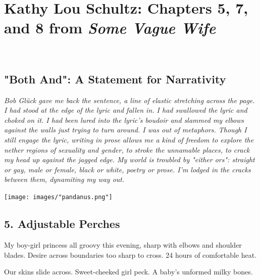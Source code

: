 \documentclass[
]{memoir}
\begin{document}
~

\hypertarget{kathy-lou-schultz-chapters-5-7-and-8-from-some-vague-wife}{%
\chapter{\texorpdfstring{Kathy Lou Schultz: Chapters 5, 7, and 8 from
\emph{Some Vague
Wife}}{Kathy Lou Schultz: Chapters 5, 7, and 8 from Some Vague Wife}}\label{kathy-lou-schultz-chapters-5-7-and-8-from-some-vague-wife}}

~

\hypertarget{both-and-a-statement-for-narrativity}{%
\section*{"Both And": A Statement for
Narrativity}\label{both-and-a-statement-for-narrativity}}

\emph{Bob Glück gave me back the sentence, a line of elastic stretching
across the page. I had stood at the edge of the lyric and fallen in. I
had swallowed the lyric and choked on it. I had been lured into the
lyric's boudoir and slammed my elbows against the walls just trying to
turn around. I was out of metaphors. Though I still engage the lyric,
writing in prose allows me a kind of freedom to explore the nether
regions of sexuality and gender, to stroke the unnamable places, to
crack my head up against the jagged edge. My world is troubled by
"either ors": straight or gay, male or female, black or white, poetry or
prose. I'm lodged in the cracks between them, dynamiting my way out.}

\begin{center}\texttt{[image: images/"pandanus.png"]}\end{center}

\hypertarget{adjustable-perches}{%
\section*{5. Adjustable Perches}\label{adjustable-perches}}

My boy-girl princess all groovy this evening, sharp with elbows and
shoulder blades. Desire across boundaries too sharp to cross. 24 hours
of comfortable heat.

Our skins slide across. Sweet-cheeked girl peck. A baby's unformed milky
bones.
\end{document}
